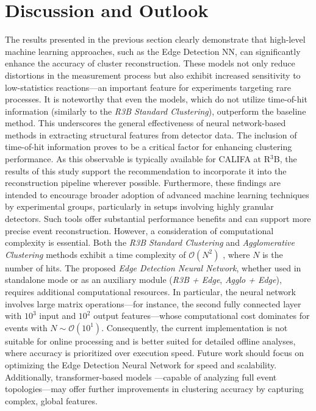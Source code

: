 \documentclass[final,5p,times,twocolumn]{elsarticle}
\begin{document}
\section{Discussion and Outlook}\label{sec:disc_outlook}

The results presented in the previous section clearly demonstrate that high-level machine learning approaches, such as the Edge Detection NN, can significantly enhance the accuracy of cluster reconstruction. These models not only reduce distortions in the measurement process but also exhibit increased sensitivity to low-statistics reactions—an important feature for experiments targeting rare processes.\newline
It is noteworthy that even the models, which do not utilize time-of-hit information (similarly to the \textit{R3B Standard Clustering}), outperform the baseline method. This underscores the general effectiveness of neural network-based methods in extracting structural features from detector data.\newline
The inclusion of time-of-hit information proves to be a critical factor for enhancing clustering performance. As this observable is typically available for CALIFA at R$^3$B, the results of this study support the recommendation to incorporate it into the reconstruction pipeline wherever possible.\newline
Furthermore, these findings are intended to encourage broader adoption of advanced machine learning techniques by experimental groups, particularly in setups involving highly granular detectors. Such tools offer substantial performance benefits and can support more precise event reconstruction.\newline
However, a consideration of computational complexity is essential. Both the \textit{R3B Standard Clustering} and \textit{Agglomerative Clustering} methods exhibit a time complexity of $\mathcal{O}(N^2)$ \cite{sieranoja2025fast}, where $N$ is the number of hits. The proposed \textit{Edge Detection Neural Network}, whether used in standalone mode or as an auxiliary module (\textit{R3B + Edge}, \textit{Agglo + Edge}), requires additional computational resources. In particular, the neural network involves large matrix operations—for instance, the second fully connected layer with $10^3$ input and $10^2$ output features—whose computational cost dominates for events with $N \sim \mathcal{O}(10^1)$. Consequently, the current implementation is not suitable for online processing and is better suited for detailed offline analyses, where accuracy is prioritized over execution speed.\newline
Future work should focus on optimizing the Edge Detection Neural Network for speed and scalability. Additionally, transformer-based models \cite{vaswani2017attention}—capable of analyzing full event topologies—may offer further improvements in clustering accuracy by capturing complex, global features.
\end{document}
